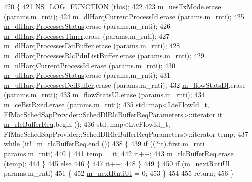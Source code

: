 \begin{DoxyCode}
420 \{
421   \hyperlink{log-macros-disabled_8h_a90b90d5bad1f39cb1b64923ea94c0761}{NS\_LOG\_FUNCTION} (\textcolor{keyword}{this});
422   
423   \hyperlink{classns3_1_1TdBetFfMacScheduler_a4488d2d9dc706b42ef06e493332042cd}{m\_uesTxMode}.erase (params.m\_rnti);
424   \hyperlink{classns3_1_1TdBetFfMacScheduler_ac0ed078aaa3bb69134023425a66ff84a}{m\_dlHarqCurrentProcessId}.erase (params.m\_rnti);
425   \hyperlink{classns3_1_1TdBetFfMacScheduler_af9f2ffd80c6d473a5ccee8fb153d40f6}{m\_dlHarqProcessesStatus}.erase  (params.m\_rnti);
426   \hyperlink{classns3_1_1TdBetFfMacScheduler_a6421f37924ac8b08b528aec9e7386678}{m\_dlHarqProcessesTimer}.erase (params.m\_rnti);
427   \hyperlink{classns3_1_1TdBetFfMacScheduler_a94ed0382052c7b9665c5f04bce88fe6e}{m\_dlHarqProcessesDciBuffer}.erase  (params.m\_rnti);
428   \hyperlink{classns3_1_1TdBetFfMacScheduler_a066bceddaca3ed4a25974ada3aba3028}{m\_dlHarqProcessesRlcPduListBuffer}.erase  (params.m\_rnti);
429   \hyperlink{classns3_1_1TdBetFfMacScheduler_a0776a2fc3f7186d7ec4491dc21706596}{m\_ulHarqCurrentProcessId}.erase  (params.m\_rnti);
430   \hyperlink{classns3_1_1TdBetFfMacScheduler_a41bae8c97c560b2a314650d7e99bd356}{m\_ulHarqProcessesStatus}.erase  (params.m\_rnti);
431   \hyperlink{classns3_1_1TdBetFfMacScheduler_a24641ddb697d45df50ee7bcaaacdb1e1}{m\_ulHarqProcessesDciBuffer}.erase  (params.m\_rnti);
432   \hyperlink{classns3_1_1TdBetFfMacScheduler_a78d90d229bd176d578a607688cdf69a6}{m\_flowStatsDl}.erase  (params.m\_rnti);
433   \hyperlink{classns3_1_1TdBetFfMacScheduler_a192dacbea27307776249e60660fa005e}{m\_flowStatsUl}.erase  (params.m\_rnti);
434   \hyperlink{classns3_1_1TdBetFfMacScheduler_ab10364d54dad2ec2afed0c168cdad4d3}{m\_ceBsrRxed}.erase (params.m\_rnti);
435   std::map<LteFlowId\_t, FfMacSchedSapProvider::SchedDlRlcBufferReqParameters>::iterator it = 
      \hyperlink{classns3_1_1TdBetFfMacScheduler_a2c9685f472af05693a869d043fc1d35c}{m\_rlcBufferReq}.begin ();
436   std::map<LteFlowId\_t, FfMacSchedSapProvider::SchedDlRlcBufferReqParameters>::iterator temp;
437   \textcolor{keywordflow}{while} (it!=\hyperlink{classns3_1_1TdBetFfMacScheduler_a2c9685f472af05693a869d043fc1d35c}{m\_rlcBufferReq}.end ())
438     \{
439       \textcolor{keywordflow}{if} ((*it).first.m\_rnti == params.m\_rnti)
440         \{
441           temp = it;
442           it++;
443           \hyperlink{classns3_1_1TdBetFfMacScheduler_a2c9685f472af05693a869d043fc1d35c}{m\_rlcBufferReq}.erase (temp);
444         \}
445       \textcolor{keywordflow}{else}
446         \{
447           it++;
448         \}
449     \}
450   \textcolor{keywordflow}{if} (\hyperlink{classns3_1_1TdBetFfMacScheduler_affbc3b6450778e77fbc0e20cb575d1b0}{m\_nextRntiUl} == params.m\_rnti)
451     \{
452       \hyperlink{classns3_1_1TdBetFfMacScheduler_affbc3b6450778e77fbc0e20cb575d1b0}{m\_nextRntiUl} = 0;
453     \}
454 
455   \textcolor{keywordflow}{return};
456 \}
\end{DoxyCode}


